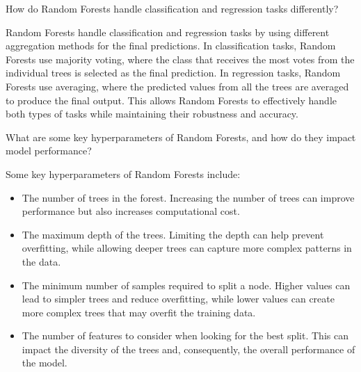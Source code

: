 \begin{ejercicio}
    How do Random Forests handle classification and regression tasks differently?

    Random Forests handle classification and regression tasks by using different aggregation methods for the final predictions. In classification tasks, Random Forests use majority voting, where the class that receives the most votes from the individual trees is selected as the final prediction. In regression tasks, Random Forests use averaging, where the predicted values from all the trees are averaged to produce the final output. This allows Random Forests to effectively handle both types of tasks while maintaining their robustness and accuracy.
\end{ejercicio}

\begin{ejercicio}
    What are some key hyperparameters of Random Forests, and how do they impact model performance?

    Some key hyperparameters of Random Forests include:
    \begin{itemize}
        \item The number of trees in the forest. Increasing the number of trees can improve performance but also increases computational cost.
        \item The maximum depth of the trees. Limiting the depth can help prevent overfitting, while allowing deeper trees can capture more complex patterns in the data.
        \item The minimum number of samples required to split a node. Higher values can lead to simpler trees and reduce overfitting, while lower values can create more complex trees that may overfit the training data.
        \item The number of features to consider when looking for the best split. This can impact the diversity of the trees and, consequently, the overall performance of the model.
    \end{itemize}
\end{ejercicio}

